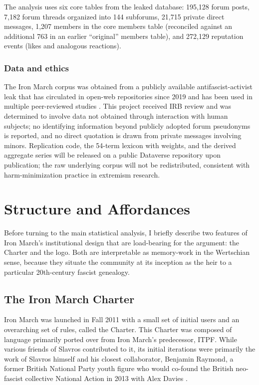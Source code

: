 \documentclass[bibtex,autowc,nonblind]{apsr_submission}
\begin{document}
The analysis uses six core tables from the leaked database: 195,128 forum posts, 7,182 forum threads organized into 144 subforums, 21,715 private direct messages, 1,207 members in the core members table (reconciled against an additional 763 in an earlier ``original'' members table), and 272,129 reputation events (likes and analogous reactions).

\subsubsection*{Data and ethics}

The Iron March corpus was obtained from a publicly available antifascist-activist leak that has circulated in open-web repositories since 2019 and has been used in multiple peer-reviewed studies \citep{upchurch, singer2020iron, ross2019transnational, sunshine2024neo}. This project received IRB review and was determined to involve data not obtained through interaction with human subjects; no identifying information beyond publicly adopted forum pseudonyms is reported, and no direct quotation is drawn from private messages involving minors. Replication code, the 54-term lexicon with weights, and the derived aggregate series will be released on a public Dataverse repository upon publication; the raw underlying corpus will not be redistributed, consistent with harm-minimization practice in extremism research.

\section{Structure and Affordances}

Before turning to the main statistical analysis, I briefly describe two features of Iron March's institutional design that are load-bearing for the argument: the Charter and the logo. Both are interpretable as memory-work in the Wertschian sense, because they situate the community at its inception as the heir to a particular 20th-century fascist genealogy.

\subsection{The Iron March Charter}

Iron March was launched in Fall 2011 with a small set of initial users and an overarching set of rules, called the Charter. This Charter was composed of language primarily ported over from Iron March's predecessor, ITPF. While various friends of Slavros contributed to it, its initial iterations were primarily the work of Slavros himself and his closest collaborator, Benjamin Raymond, a former British National Party youth figure who would co-found the British neo-fascist collective National Action in 2013 with Alex Davies \citep{macklin2018only, macklin2020failed}.
\end{document}
